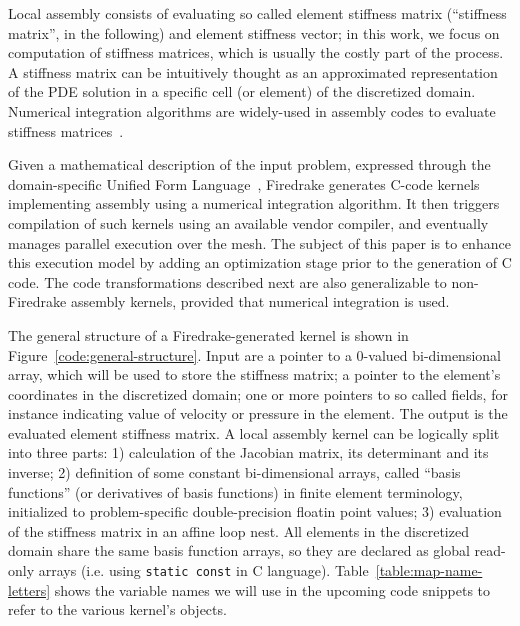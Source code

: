 \documentclass[conference]{IEEEtran}
\begin{document}
Local assembly consists of evaluating so called element stiffness matrix (``stiffness matrix'', in the following) and element stiffness vector; in this work, we focus on computation of stiffness matrices, which is usually the costly part of the process. A stiffness matrix can be intuitively thought as an approximated representation of the PDE solution in a specific cell (or element) of the discretized domain. Numerical integration algorithms are widely-used in assembly codes to evaluate stiffness matrices~\cite{quadrature1, fluidity_manual_v4}. 

Given a mathematical description of the input problem, expressed through the domain-specific Unified Form Language~\cite{ufl}, Firedrake generates C-code kernels implementing assembly using a numerical integration algorithm. It then triggers compilation of such kernels using an available vendor compiler, and eventually manages parallel execution over the mesh. The subject of this paper is to enhance this execution model by adding an optimization stage prior to the generation of C code. The code transformations described next are also generalizable to non-Firedrake assembly kernels, provided that numerical integration is used.

The general structure of a Firedrake-generated kernel is shown in Figure~\ref{code:general-structure}. Input are a pointer to a 0-valued bi-dimensional array, which will be used to store the stiffness matrix; a pointer to the element's coordinates in the discretized domain; one or more pointers to so called fields, for instance indicating value of velocity or pressure in the element. The output is the evaluated element stiffness matrix. A local assembly kernel can be logically split into three parts: 1) calculation of the Jacobian matrix, its determinant and its inverse; 2) definition of some constant bi-dimensional arrays, called ``basis functions'' (or derivatives of basis functions) in finite element terminology, initialized to problem-specific double-precision floatin point values; 3) evaluation of the stiffness matrix in an affine loop nest. All elements in the discretized domain share the same basis function arrays, so they are declared as global read-only arrays (i.e. using \texttt{static const} in C language). Table~\ref{table:map-name-letters} shows the variable names we will use in the upcoming code snippets to refer to the various kernel's objects. 
\end{document}
